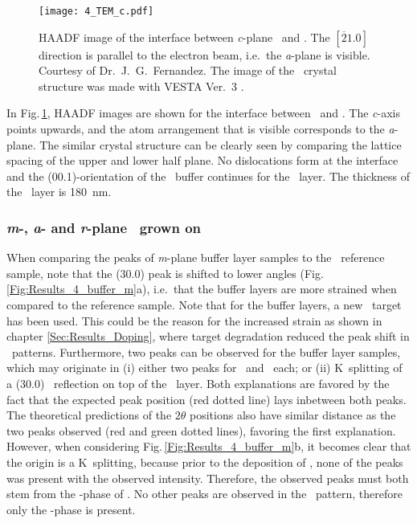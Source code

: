 \begin{figure}
    \centering
    \texttt{[image: 4\_TEM\_c.pdf]}
    \caption{
        \acrshort{HAADF} image of the interface between \textit{c}-plane \cro\ and \agao.
        The $[\overline{2}1.0]$ direction is parallel to the electron beam, i.e.\ the \textit{a}-plane is visible.
        Courtesy of Dr.\ J.\ G.\  Fernandez.
        The image of the \agao\ crystal structure was made with VESTA Ver.~3 \cite{momma2011}.
    }
    \label{Fig:Results_4_TEM_c}
\end{figure}
In Fig.\,\ref{Fig:Results_4_TEM_c}, \acrshort{HAADF} images are shown for the interface between \agao\ and \cro.
The \textit{c}-axis points upwards, and the atom arrangement that is visible corresponds to the \textit{a}-plane.
The similar crystal structure can be clearly seen by comparing the lattice spacing of the upper and lower half plane.
No dislocations form at the interface and the (00.1)-orientation of the \cro\ buffer continues for the \gao\ layer.
The thickness of the \agao\ layer is \qty{180}{\nm}.

\subsubsection*{\textit{m}-, \textit{a}- and \textit{r}-plane \texorpdfstring{\agao}{a-Ga2O3}\ grown on \texorpdfstring{\cro}
{Cr2O3}}


When comparing the peaks of \textit{m}-plane buffer layer samples to the \cro\ reference sample, note that the (30.0) peak is shifted to lower angles (Fig.\,\ref{Fig:Results_4_buffer_m}a), i.e.\ that the buffer layers are more strained when compared to the reference sample.
Note that for the buffer layers, a new \cro\ target has been used.
This could be the reason for the increased strain as shown in chapter \ref{Sec:Results_Doping}, where target degradation reduced the peak shift in \thetaomega\ patterns.
Furthermore, two peaks can be observed for the buffer layer samples, which may originate in (i) either two peaks for \cro\ and \agao\ each; or (ii) K\textalpha\ splitting of a (30.0) \agao\ reflection on top of the \cro\ layer.
Both explanations are favored by the fact that the expected peak position (red dotted line) lays inbetween both peaks.
The theoretical predictions of the $2\theta$ positions also have similar distance as the two peaks observed (red and green dotted lines), favoring the first explanation.
However, when considering Fig.\,\ref{Fig:Results_4_buffer_m}b, it becomes clear that the origin is a K\textalpha\ splitting, because prior to the deposition of \gao, none of the peaks was present with the observed intensity.
Therefore, the observed peaks must both stem from the \textalpha-phase of \gao.
No other peaks are observed in the \thetaomega\ pattern, therefore only the \textalpha-phase is present.

